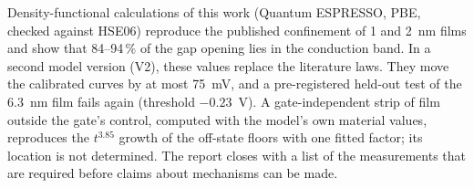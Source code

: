 Density-functional calculations of this work (Quantum ESPRESSO, PBE, checked against HSE06) reproduce the published
confinement of 1 and 2~nm \InO{} films and show that 84--94\,\% of the gap opening lies in the conduction band. In a
second model version (V2), these values replace the literature laws. They move the calibrated curves by at most
75~mV, and a pre-registered held-out test of the 6.3~nm film fails again (threshold $-0.23$~V). A gate-independent
strip of film outside the gate's control, computed with the model's own material values, reproduces the
$t^{3.85}$ growth of the off-state floors with one fitted factor; its location is not determined. The report closes with a list of the measurements that are required before claims about mechanisms can be made.
